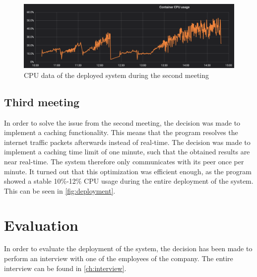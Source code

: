 \begin{figure}
    \centering
    \includegraphics[width=\textwidth]{gfx/load-60.png}
    \caption{CPU data of the deployed system during the second meeting}
    \label{fig:60}
\end{figure}

\subsection{Third meeting}
In order to solve the issue from the second meeting, the decision was made to implement a caching functionality. This means that the program resolves the internet traffic packets afterwards instead of real-time. The decision was made to implement a caching time limit of one minute, such that the obtained results are near real-time. The system therefore only communicates with its peer once per minute. It turned out that this optimization was efficient enough, as the program showed a stable 10\%-12\% CPU usage during the entire deployment of the system. This can be seen in \autoref{fig:deployment}.

\section{Evaluation} \label{sec:sb-evaluation}
In order to evaluate the deployment of the system, the decision has been made to perform an interview with one of the employees of the company. The entire interview can be found in \autoref{ch:interview}.